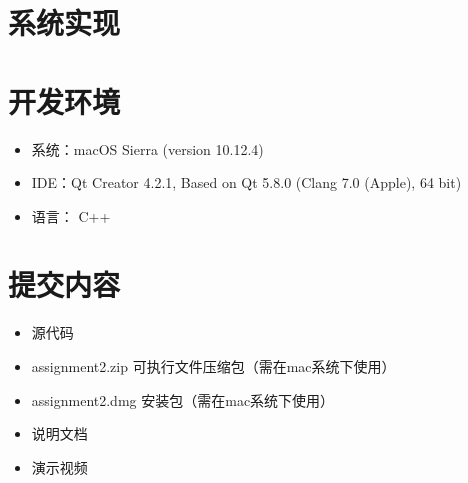 \documentclass{article}
\begin{document}
\begin{CJK}{UTF8}{gbsn}
\vspace{3em}
\section{系统实现}


\vspace{3em}
\section{开发环境}
\begin{itemize}
	\item 系统：macOS Sierra (version 10.12.4)
	\item IDE：Qt Creator 4.2.1, Based on Qt 5.8.0 (Clang 7.0 (Apple), 64 bit)
	\item 语言： C++
\end{itemize}

\vspace{3em}
\section{提交内容}
\begin{itemize}
	\item 源代码
	\item assignment2.zip 可执行文件压缩包（需在mac系统下使用）
	\item assignment2.dmg 安装包（需在mac系统下使用）
	\item 说明文档
	\item 演示视频
\end{itemize}

\end{CJK}
\end{document}
